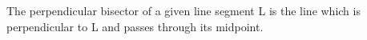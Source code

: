 The perpendicular bisector of a given line segment L is the line which is
perpendicular to L and passes through its midpoint.